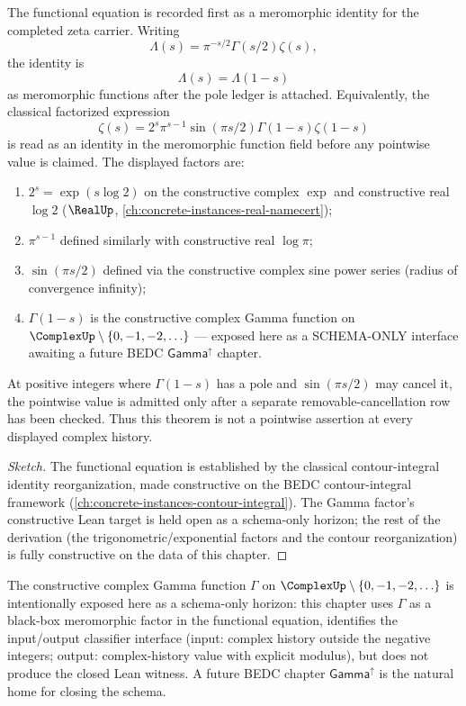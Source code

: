 \begin{theorem}
\label{thm:functional-equation}
The functional equation is recorded first as a meromorphic identity for the completed zeta carrier. Writing
$$
\Lambda(s)=\pi^{-s/2}\Gamma(s/2)\zeta(s),
$$
the identity is
$$
\Lambda(s)=\Lambda(1-s)
$$
as meromorphic functions after the pole ledger is attached. Equivalently, the classical factorized expression
$$
\zeta(s)=2^s\pi^{s-1}\sin(\pi s/2)\Gamma(1-s)\zeta(1-s)
$$
is read as an identity in the meromorphic function field before any pointwise value is claimed. The displayed factors are:
\begin{enumerate}
  \item \(2^s = \exp(s \log 2)\) on the constructive complex \(\exp\) and constructive real \(\log 2\) (\(\RealUp\), \autoref{ch:concrete-instances-real-namecert});
  \item \(\pi^{s-1}\) defined similarly with constructive real \(\log \pi\);
  \item \(\sin(\pi s / 2)\) defined via the constructive complex sine power series (radius of convergence infinity);
  \item \(\Gamma(1 - s)\) is the constructive complex Gamma function on \(\ComplexUp \setminus \{0, -1, -2, \ldots\}\) --- exposed here as a SCHEMA-ONLY interface awaiting a future BEDC \(\mathsf{Gamma}^{\uparrow}\) chapter.
\end{enumerate}
At positive integers where \(\Gamma(1-s)\) has a pole and \(\sin(\pi s/2)\) may cancel it, the pointwise value is admitted only after a separate removable-cancellation row has been checked. Thus this theorem is not a pointwise assertion at every displayed complex history.
\end{theorem}
\begin{proof}[Sketch]
The functional equation is established by the classical contour-integral identity reorganization, made constructive on the BEDC contour-integral framework (\autoref{ch:concrete-instances-contour-integral}). The Gamma factor's constructive Lean target is held open as a schema-only horizon; the rest of the derivation (the trigonometric/exponential factors and the contour reorganization) is fully constructive on the data of this chapter.
\end{proof}

\begin{remark}
\label{rem:gamma-schema-horizon}
The constructive complex Gamma function \(\Gamma\) on \(\ComplexUp \setminus \{0, -1, -2, \ldots\}\) is intentionally exposed here as a schema-only horizon: this chapter uses \(\Gamma\) as a black-box meromorphic factor in the functional equation, identifies the input/output classifier interface (input: complex history outside the negative integers; output: complex-history value with explicit modulus), but does not produce the closed Lean witness. A future BEDC chapter \(\mathsf{Gamma}^{\uparrow}\) is the natural home for closing the schema.
\end{remark}

